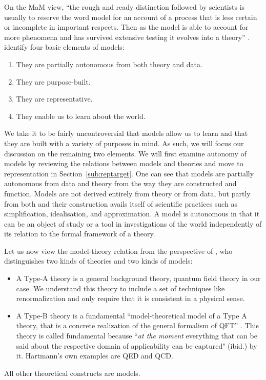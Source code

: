 On the MaM view, ``the rough and ready distinction followed by scientists is usually to reserve the word model for an account of a process that is less certain or incomplete in important respects. 
Then as the model is able to account for more phenomena and has survived extensive testing it evolves into a theory'' \citep[p.~18]{morganmorrison}. 
\citeauthor{morganmorrison} identify four basic elements of models: 
\begin{enumerate}
	\item They are partially autonomous from both theory and data.
	\item They are purpose-built.
	\item They are representative.
	\item They enable us to learn about the world.
\end{enumerate}
We take it to be fairly uncontroversial that models allow us to learn and that they are built with a variety of purposes in mind.
As such, we will focus our discussion on the remaining two elements.
We will first examine autonomy of models by reviewing the relations between models and theories and move to representation in Section~\ref{sub:reptarget}.
One can see that models are partially autonomous from data and theory from the way they are constructed and function.
Models are not derived entirely from theory or from data, but partly from both and their construction avails itself of scientific practices such as simplification, idealisation, and approximation.
A model is autonomous in that it can be an object of study or a tool in investigations of the world independently of its relation to the formal framework of a theory.

Let us now view the model-theory relation from the perspective of \citet{hartmann1998}, who distinguishes two kinds of theories and two kinds of models:
\begin{itemize}
\item A Type-A theory is a general background theory, quantum field theory in our case. We understand this theory to include a set of techniques like renormalization and only require that it is consistent in a physical sense. 
\item A Type-B theory is a fundamental ``model-theoretical model of a Type A theory, that is a concrete realization of the general formalism of QFT'' \citep[][p.~101]{hartmann1998}. This theory is called fundamental because ``{\it at the moment} everything that can be said about the respective domain of applicability can be captured" (ibid.) by it. 
Hartmann's own examples are QED and QCD.
\end{itemize}
All other theoretical constructs are models. 


